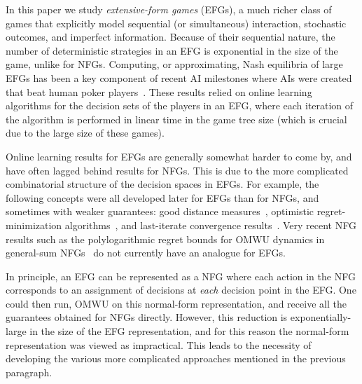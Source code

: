 In this paper we study \emph{extensive-form games} (EFGs), a much richer class of games that explicitly model sequential (or simultaneous) interaction, stochastic outcomes, and imperfect information. Because of their sequential nature, the number of deterministic strategies in an EFG is exponential in the size of the game, unlike for NFGs.
Computing, or approximating, Nash equilibria of large EFGs has been a key component of recent AI milestones where AIs were created that beat human poker players~\citep{Bowling15:Heads,Brown19:Superhuman,Brown17:Superhuman,Moravvcik17:DeepStack}.
These results relied on online learning algorithms for the decision sets of the players in an EFG, where each iteration of the algorithm is performed in linear time in the game tree size (which is crucial due to the large size of these games).

Online learning results for EFGs are generally somewhat harder to come by, and have often lagged behind results for NFGs. This is due to the more complicated combinatorial structure of the decision spaces in EFGs.
For example, the following concepts were all developed later for EFGs than for NFGs, and sometimes with weaker guarantees: good distance measures~\citep{Hoda10:Smoothing,Kroer15:Faster,Kroer20:Faster,Farina21:Better}, optimistic regret-minimization algorithms~\citep{Farina19:Optimistic,Farina19:Stable}, and last-iterate convergence results~\citep{Wei21:Linear,Lee21:Last}. Very recent NFG results such as the polylogarithmic regret bounds for OMWU dynamics in general-sum NFGs~\citep{Daskalakis21:Near} do not currently have an analogue for EFGs.

In principle, an EFG can be represented as a NFG where each action in the NFG corresponds to an assignment of decisions at \emph{each} decision point in the EFG.
One could then run, \eg OMWU on this normal-form representation, and receive all the guarantees obtained for NFGs directly.
However, this reduction is exponentially-large in the size of the EFG representation, and for this reason the normal-form representation was viewed as impractical.
This leads to the necessity of developing the various more complicated approaches mentioned in the previous paragraph.

